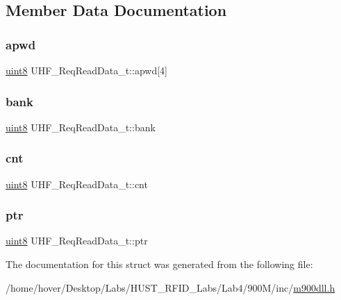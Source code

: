 \subsection{Member Data Documentation}
\mbox{\label{struct_u_h_f___req_read_data__t_a379927c7ffdb967de9d1416e39ccb992}} 
\subsubsection{\texorpdfstring{apwd}{apwd}}
{\footnotesize\ttfamily \mbox{\hyperlink{m900dll_8h_adde6aaee8457bee49c2a92621fe22b79}{uint8}} U\+H\+F\+\_\+\+Req\+Read\+Data\+\_\+t\+::apwd\mbox{[}4\mbox{]}}

\mbox{\label{struct_u_h_f___req_read_data__t_a9b09d6c2d0d05cd0acdcb3ae193c2a1a}} 
\subsubsection{\texorpdfstring{bank}{bank}}
{\footnotesize\ttfamily \mbox{\hyperlink{m900dll_8h_adde6aaee8457bee49c2a92621fe22b79}{uint8}} U\+H\+F\+\_\+\+Req\+Read\+Data\+\_\+t\+::bank}

\mbox{\label{struct_u_h_f___req_read_data__t_a96ac3297016773a0cb5f41c5e61a531a}} 
\subsubsection{\texorpdfstring{cnt}{cnt}}
{\footnotesize\ttfamily \mbox{\hyperlink{m900dll_8h_adde6aaee8457bee49c2a92621fe22b79}{uint8}} U\+H\+F\+\_\+\+Req\+Read\+Data\+\_\+t\+::cnt}

\mbox{\label{struct_u_h_f___req_read_data__t_a17235c8462b620de70acd4eeb074a0a6}} 
\subsubsection{\texorpdfstring{ptr}{ptr}}
{\footnotesize\ttfamily \mbox{\hyperlink{m900dll_8h_adde6aaee8457bee49c2a92621fe22b79}{uint8}} U\+H\+F\+\_\+\+Req\+Read\+Data\+\_\+t\+::ptr}



The documentation for this struct was generated from the following file\+:\begin{DoxyCompactItemize}
\item 
/home/hover/\+Desktop/\+Labs/\+H\+U\+S\+T\+\_\+\+R\+F\+I\+D\+\_\+\+Labs/\+Lab4/900\+M/inc/\mbox{\hyperlink{m900dll_8h}{m900dll.\+h}}\end{DoxyCompactItemize}
